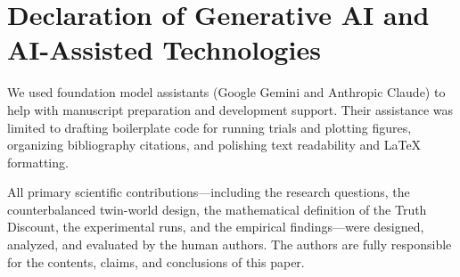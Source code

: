 \section{Declaration of Generative AI and AI-Assisted Technologies}
\label{app:ai_disclosure}

We used foundation model assistants (Google Gemini and Anthropic Claude) to help with manuscript preparation and development support. Their assistance was limited to drafting boilerplate code for running trials and plotting figures, organizing bibliography citations, and polishing text readability and \LaTeX{} formatting. 

All primary scientific contributions---including the research questions, the counterbalanced twin-world design, the mathematical definition of the Truth Discount, the experimental runs, and the empirical findings---were designed, analyzed, and evaluated by the human authors. The authors are fully responsible for the contents, claims, and conclusions of this paper.
